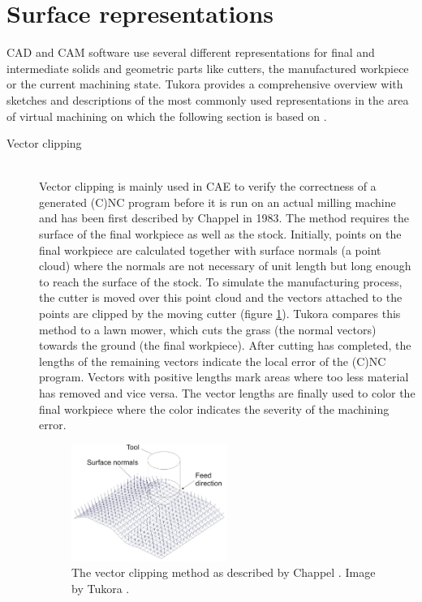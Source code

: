 \section{Surface representations}
\label{sec:surface_representations}

CAD and CAM software use several different representations for final and intermediate solids and geometric parts like cutters, the manufactured workpiece or the current machining state.
Tukora provides a comprehensive overview with sketches and descriptions of the most commonly used representations in the area of virtual machining on which the following section is based on \cite{virtual_machining_review}. 

\begin{description}
	\item[Vector clipping] \hfill \\
	Vector clipping is mainly used in CAE to verify the correctness of a generated (C)NC program before it is run on an actual milling machine and has been first described by Chappel \cite{vector_clipping} in 1983.
	The method requires the surface of the final workpiece as well as the stock.
	Initially, points on the final workpiece are calculated together with surface normals (\ie a point cloud) where the normals are not necessary of unit length but long enough to reach the surface of the stock.
	To simulate the manufacturing process, the cutter is moved over this point cloud and the vectors attached to the points are clipped by the moving cutter (\cf figure \ref{fig:vector_clipping}).
	Tukora compares this method to a lawn mower, which cuts the grass (\ie the normal vectors) towards the ground (\ie the final workpiece).
	After cutting has completed, the lengths of the remaining vectors indicate the local error of the (C)NC program.
	Vectors with positive lengths mark areas where too less material has removed and vice versa.
	The vector lengths are finally used to color the final workpiece where the color indicates the severity of the machining error. 
	
	\begin{figure}[h]
		\centering
		\includegraphics[width=0.5\textwidth]{images/vector_clipping}
		\caption{
			The vector clipping method as described by Chappel \cite{vector_clipping}.
			Image by Tukora \cite{virtual_machining_review}.
		}
		\label{fig:vector_clipping}
	\end{figure}
	 

\end{description}
